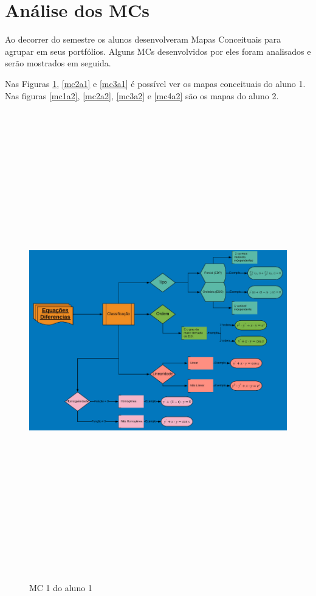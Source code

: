 \section[Análise dos MCs]{Análise dos MCs}

Ao decorrer do semestre os alunos desenvolveram Mapas Conceituais para agrupar em seus portfólios. Alguns MCs desenvolvidos por eles foram analisados e serão mostrados em seguida.

Nas Figuras \ref{mc1a1}, \ref{mc2a1} e \ref{mc3a1} é possível ver os mapas conceituais do aluno 1. Nas figuras \ref{mc1a2}, \ref{mc2a2}, \ref{mc3a2} e \ref{mc4a2} são os mapas do aluno 2.

\begin{landscape}
\begin{figure}[H]
\centering
\caption{MC 1 do aluno 1}
\includegraphics[width=210mm, height=200mm,keepaspectratio]{figuras/MC/mc1_1.png}
\label{mc1a1}
\end{figure}
\end{landscape}


